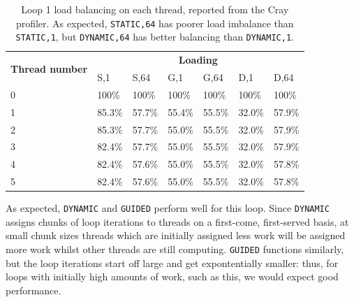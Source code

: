 \documentclass{article} %
\newcommand{\tp}{\texttt}
\begin{document}
\begin{table}[b]
    \centering
    \begin{tabular}{@{}lllllll@{}}
    \toprule
    \multirow{2}{*}{\textbf{Thread number}} & \multicolumn{6}{c}{\textbf{Loading}}                \\
                                            & S,1    & S,64   & G,1    & G,64   & D,1    & D,64   \\ \midrule
    0                                       & 100\%  & 100\%  & 100\%  & 100\%  & 100\%  & 100\%  \\
    1                                       & 85.3\% & 57.7\% & 55.4\% & 55.5\% & 32.0\% & 57.9\% \\
    2                                       & 85.3\% & 57.7\% & 55.0\% & 55.5\% & 32.0\% & 57.9\% \\
    3                                       & 82.4\% & 57.7\% & 55.0\% & 55.5\% & 32.0\% & 57.9\% \\
    4                                       & 82.4\% & 57.6\% & 55.0\% & 55.5\% & 32.0\% & 57.8\% \\
    5                                       & 82.4\% & 57.6\% & 55.0\% & 55.5\% & 32.0\% & 57.8\% \\ \bottomrule
    \end{tabular}
    \caption{Loop 1 load balancing on each thread, reported from the Cray profiler. As expected, \tp{STATIC,64} has poorer load imbalance than \tp{STATIC,1}, but \tp{DYNAMIC,64} has better balancing than \tp{DYNAMIC,1}.}
    \label{tbl:loop1profiling}
\end{table}

As expected, \tp{DYNAMIC} and \tp{GUIDED} perform well for this loop.
Since \tp{DYNAMIC} assigns chunks of loop iterations to threads on a first-come, first-served basis, at small chunk sizes threads which are initially assigned less work will be assigned more work whilst other threads are still computing. 
\tp{GUIDED} functions similarly, but the loop iterations start off large and get expontentially smaller: thus, for loops with initially high amounts of work, such as this, we would expect good performance.
\end{document}
